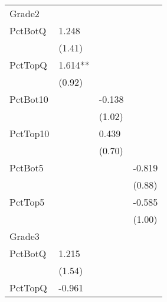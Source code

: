 \begin{table}[htb]
\begin{threeparttable}
\begin{tabular}{l l l l}
      \hline
      Grade2   &                               &                               &                              \\
      PctBotQ  & 1.248                         &                               &                              \\
               & (1.41)                        &                               &                              \\
      PctTopQ  & 1.614**                       &                               &                              \\
               & (0.92)                        &                               &                              \\
      PctBot10 &                               & -0.138                        &                              \\
               &                               & (1.02)                        &                              \\
      PctTop10 &                               & 0.439                         &                              \\
               &                               & (0.70)                        &                              \\
      PctBot5  &                               &                               & -0.819                       \\
               &                               &                               & (0.88)                       \\
      PctTop5  &                               &                               & -0.585                       \\
               &                               &                               & (1.00)                       \\
      \hline
      Grade3   &                               &                               &                              \\
      PctBotQ  & 1.215                         &                               &                              \\
               & (1.54)                        &                               &                              \\
      PctTopQ  & -0.961                        &                               &                              \\

\end{tabular}
\end{threeparttable}
\end{table}
